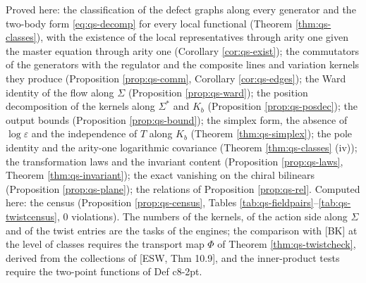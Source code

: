 \documentclass[11pt]{article}
\numberwithin{equation}{section}
\theoremstyle{plain}
\theoremstyle{definition}
\begin{document}
Proved here: the classification of the defect graphs along every generator and the two-body form \eqref{eq:qs-decomp} for every local functional (Theorem \ref{thm:qs-classes}), with the existence of the local representatives through arity one given the master equation through arity one (Corollary \ref{cor:qs-exist}); the commutators of the generators with the regulator and the composite lines and variation kernels they produce (Proposition \ref{prop:qs-comm}, Corollary \ref{cor:qs-edges}); the Ward identity of the flow along $\Sigma$ (Proposition \ref{prop:qs-ward}); the position decomposition of the kernels along $\Sigma^*$ and $K_b$ (Proposition \ref{prop:qs-posdec}); the output bounds (Proposition \ref{prop:qs-bound}); the simplex form, the absence of $\log\varepsilon$ and the independence of $T$ along $K_b$ (Theorem \ref{thm:qs-simplex}); the pole identity and the arity-one logarithmic covariance (Theorem \ref{thm:qs-classes} (iv)); the transformation laws and the invariant content (Proposition \ref{prop:qs-laws}, Theorem \ref{thm:qs-invariant}); the exact vanishing on the chiral bilinears (Proposition \ref{prop:qs-plane}); the relations of Proposition \ref{prop:qs-rel}. Computed here: the census (Proposition \ref{prop:qs-census}, Tables \ref{tab:qs-fieldpairs}--\ref{tab:qs-twistcensus}, $0$ violations). The numbers of the kernels, of the action side along $\Sigma$ and of the twist entries are the tasks of the engines; the comparison with [BK] at the level of classes requires the transport map $\Phi$ of Theorem \ref{thm:qs-twistcheck}, derived from the collections of [ESW, Thm 10.9], and the inner-product tests require the two-point functions of Def c8-2pt.
\end{document}
